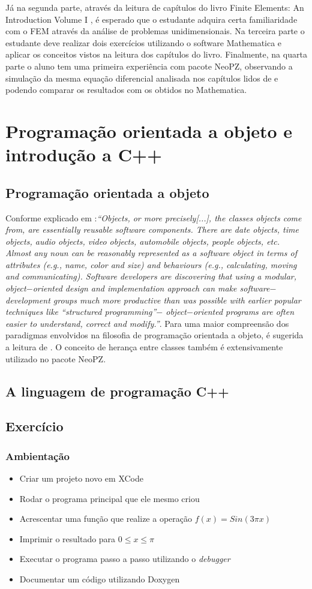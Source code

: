 \documentclass[11pt, oneside, hidelinks]{article}   	%
\begin{document}
Já na segunda parte, através da leitura de capítulos do livro Finite Elements: An Introduction Volume I \citep{oden81}, é esperado que o estudante adquira certa familiaridade com o FEM através da análise de problemas unidimensionais. Na terceira parte o estudante deve realizar dois exercícios utilizando o software Mathematica e aplicar os conceitos vistos na leitura dos capítulos do livro. Finalmente, na quarta parte o aluno tem uma primeira experiência com pacote NeoPZ, observando a simulação da mesma equação diferencial analisada nos capítulos lidos de \citet{oden81} e podendo comparar os resultados com os obtidos no Mathematica. 
\newpage

\section{Programação orientada a objeto e introdução a C++}
\subsection{Programação orientada a objeto}
Conforme explicado em \citet{deitel12}:\emph{``Objects, or more precisely[...], the classes objects come from, are essentially reusable software components. There are date objects, time objects, audio objects, video objects, automobile objects, people objects, etc. Almost any noun can be reasonably represented as a software object in terms of attributes (e.g., name, color and size) and behaviours (e.g., calculating, moving and communicating). Software developers are discovering that using a modular, object$-$oriented design and implementation approach can make software$-$development groups much more productive than was possible with earlier popular techniques like ``structured programming''$-$ object$-$oriented programs are often easier to understand, correct and modify.''}. Para uma maior compreensão dos paradigmas envolvidos na filosofia de programação orientada a objeto, é sugerida a leitura de \citet{eckel00}. O conceito de herança entre classes também é extensivamente utilizado no pacote NeoPZ.
\subsection{A linguagem de programação C++}
\subsection{Exercício}
\subsubsection{Ambientação}
\begin{itemize}
\item Criar um projeto novo em XCode 
\item Rodar o programa principal que ele mesmo criou 
\item Acrescentar uma função que realize a operação $f(x) = Sin(3\pi x) $ 
\item Imprimir o resultado para $0\leq x\leq \pi$ 
\item Executar o programa passo a passo utilizando o \emph{debugger}
\item Documentar um código utilizando Doxygen 
\end{itemize}
\end{document}
